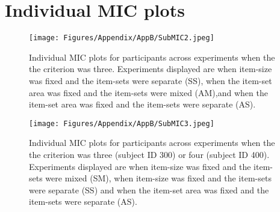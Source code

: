 \clearpage
\section{Individual MIC plots}

\begin{figure}[ht]
\centering \texttt{[image: Figures/Appendix/AppB/SubMIC2.jpeg]}
\caption{Individual MIC plots for participants across experiments when the the criterion was three. Experiments displayed are when item-size was fixed and the item-sets were separate (SS), when the item-set area was fixed and the item-sets were mixed (AM),and when the item-set area was fixed and the item-sets were separate (AS).}
\label{fig:AppB_MIC1}
\end{figure}


\begin{figure}[ht]
\centering \texttt{[image: Figures/Appendix/AppB/SubMIC3.jpeg]}
\caption{Individual MIC plots for participants across experiments when the the criterion was three (subject ID 300) or four (subject ID 400). Experiments displayed are when item-size was fixed and the item-sets were mixed (SM), when item-size was fixed and the item-sets were separate (SS) and when the item-set area was fixed and the item-sets were separate (AS).}
\label{fig:AppB_MIC2}
\end{figure}